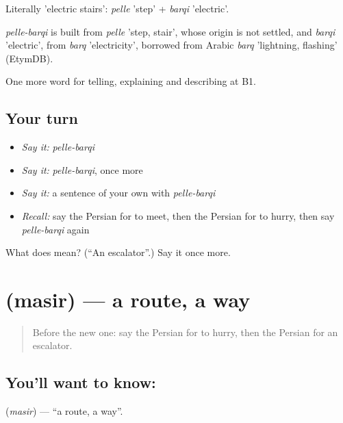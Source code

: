 Literally 'electric stairs': \emph{pelle} 'step' + \emph{barqi} 'electric'.

\begin{cousinweb}
\emph{pelle-barqi} is built from \emph{pelle} 'step, stair', whose origin is not settled, and \emph{barqi} 'electric', from \emph{barq} 'electricity', borrowed from Arabic \emph{barq} 'lightning, flashing' (EtymDB).
\end{cousinweb}

\begin{grammarlens}[title={What you've built}]
One more word for telling, explaining and describing at B1.
\end{grammarlens}

\subsection*{Your turn}
\begin{itemize}
\raggedright
  \item \emph{Say it:} \emph{pelle-barqi}
  \item \emph{Say it:} \emph{pelle-barqi}, once more
  \item \emph{Say it:} a sentence of your own with \emph{pelle-barqi}
  \item \emph{Recall:} say the Persian for to meet, then the Persian for to hurry, then say \emph{pelle-barqi} again
\end{itemize}

\begin{tcolorbox}[breakable,colback=teal!4,colframe=teal!35!black,title={Before you move on}]
What does   mean? (\textquotedblleft{}An escalator\textquotedblright{}.) Say it once more.
\end{tcolorbox}
\section[\texorpdfstring{\fa{مسیر} (masir)}{مسیر (masir)}]{ (masir) — a route, a way}

\label{lesson:FA-C434-masir}



\begin{quote}
Before the new one: say the Persian for to hurry, then the Persian for an escalator.
\end{quote}

\subsection*{You'll want to know: }
\textbf{} (\emph{masir}) — \textquotedblleft{}a route, a way\textquotedblright{}.

